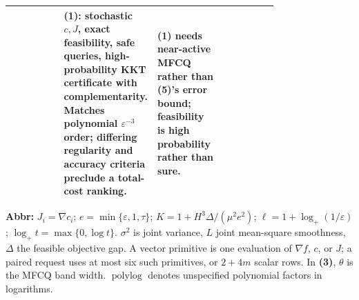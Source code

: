 \begin{table}[tp]
\begin{threeparttable}
\begin{tabularx}{\linewidth}{@{}>{\raggedright\arraybackslash}p{0.20\linewidth}>{\raggedright\arraybackslash}p{0.32\linewidth}>{\raggedright\arraybackslash}p{0.25\linewidth}>{\raggedright\arraybackslash}X@{}}
& \textbf{(1)}: stochastic $c,J$, exact feasibility, safe queries, high-probability KKT certificate with complementarity. Matches polynomial $\varepsilon^{-3}$ order; differing regularity and accuracy criteria preclude a total-cost ranking.
& \textbf{(1)} needs near-active MFCQ rather than \textbf{(5)}'s error bound; feasibility is high probability rather than sure. \\
\bottomrule
\end{tabularx}
\begin{tablenotes}[flushleft]\footnotesize
\item[] \textbf{Abbr:} $J_i=\nabla c_i$; $e=\min\{\varepsilon,1,\tau\}$; $K=1+H^3\Delta/(\mu^2e^2)$; $\ell=1+\log_+(1/\varepsilon)$; $\log_+t=\max\{0,\log t\}$. $\sigma^2$ is joint variance, $L$ joint mean-square smoothness, $\Delta$ the feasible objective gap. A vector primitive is one evaluation of $\nabla f$, $c$, or $J$; a paired request uses at most six such primitives, or $2+4m$ scalar rows. In \textbf{(3)}, $\theta$ is the MFCQ band width. $\operatorname{polylog}$ denotes unspecified polynomial factors in logarithms.
\end{tablenotes}
\end{threeparttable}
\end{table}
\clearpage
